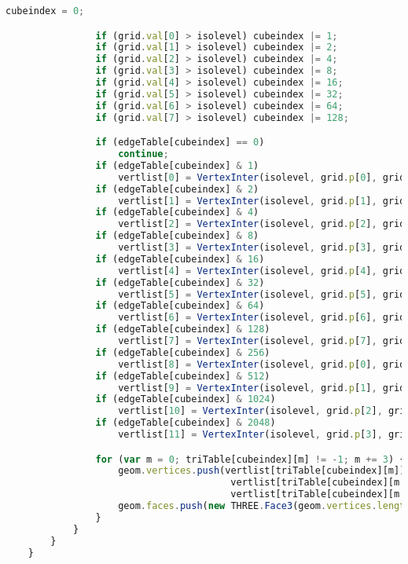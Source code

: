 \begin{lstlisting}[language=JavaScript]
                cubeindex = 0;

                if (grid.val[0] > isolevel) cubeindex |= 1;
                if (grid.val[1] > isolevel) cubeindex |= 2;
                if (grid.val[2] > isolevel) cubeindex |= 4;
                if (grid.val[3] > isolevel) cubeindex |= 8;
                if (grid.val[4] > isolevel) cubeindex |= 16;
                if (grid.val[5] > isolevel) cubeindex |= 32;
                if (grid.val[6] > isolevel) cubeindex |= 64;
                if (grid.val[7] > isolevel) cubeindex |= 128;

                if (edgeTable[cubeindex] == 0)
                    continue;
                if (edgeTable[cubeindex] & 1)
                    vertlist[0] = VertexInter(isolevel, grid.p[0], grid.p[1], grid.val[0], grid.val[1]);
                if (edgeTable[cubeindex] & 2)
                    vertlist[1] = VertexInter(isolevel, grid.p[1], grid.p[2], grid.val[1], grid.val[2]);
                if (edgeTable[cubeindex] & 4)
                    vertlist[2] = VertexInter(isolevel, grid.p[2], grid.p[3], grid.val[2], grid.val[3]);
                if (edgeTable[cubeindex] & 8)
                    vertlist[3] = VertexInter(isolevel, grid.p[3], grid.p[0], grid.val[3], grid.val[0]);
                if (edgeTable[cubeindex] & 16)
                    vertlist[4] = VertexInter(isolevel, grid.p[4], grid.p[5], grid.val[4], grid.val[5]);
                if (edgeTable[cubeindex] & 32)
                    vertlist[5] = VertexInter(isolevel, grid.p[5], grid.p[6], grid.val[5], grid.val[6]);
                if (edgeTable[cubeindex] & 64)
                    vertlist[6] = VertexInter(isolevel, grid.p[6], grid.p[7], grid.val[6], grid.val[7]);
                if (edgeTable[cubeindex] & 128)
                    vertlist[7] = VertexInter(isolevel, grid.p[7], grid.p[4], grid.val[7], grid.val[4]);
                if (edgeTable[cubeindex] & 256)
                    vertlist[8] = VertexInter(isolevel, grid.p[0], grid.p[4], grid.val[0], grid.val[4]);
                if (edgeTable[cubeindex] & 512)
                    vertlist[9] = VertexInter(isolevel, grid.p[1], grid.p[5], grid.val[1], grid.val[5]);
                if (edgeTable[cubeindex] & 1024)
                    vertlist[10] = VertexInter(isolevel, grid.p[2], grid.p[6], grid.val[2], grid.val[6]);
                if (edgeTable[cubeindex] & 2048)
                    vertlist[11] = VertexInter(isolevel, grid.p[3], grid.p[7], grid.val[3], grid.val[7]);

                for (var m = 0; triTable[cubeindex][m] != -1; m += 3) {
                    geom.vertices.push(vertlist[triTable[cubeindex][m]],
                                        vertlist[triTable[cubeindex][m + 1]],
                                        vertlist[triTable[cubeindex][m + 2]]);
                    geom.faces.push(new THREE.Face3(geom.vertices.length - 3, geom.vertices.length - 2, geom.vertices.length - 1));
                }
            }
        }
    }


\end{lstlisting}
